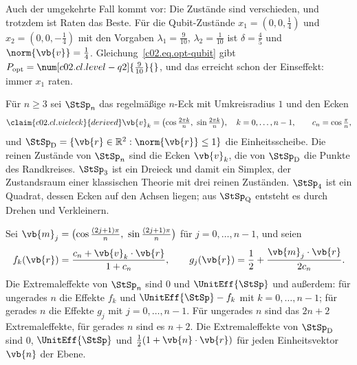 Auch der umgekehrte Fall kommt vor: Die Zustände sind verschieden, und trotzdem ist Raten
das Beste. Für die Qubit-Zustände $x_1 = (0, 0, \tfrac14)$ und $x_2 = (0, 0, -\tfrac14)$
mit den Vorgaben $\lambda_1 = \tfrac{9}{10}$, $\lambda_2 = \tfrac{1}{10}$ ist
$\delta = \tfrac45$ und $\norm{\vb{v}} = \tfrac14$. Gleichung~\eqref{c02.eq.opt-qubit} gibt
$P_{\mathrm{opt}} = \num[c02.cl.level-q2]{\tfrac{9}{10}}{}$, und das erreicht schon der
Einseffekt: immer $x_1$ raten.

\begin{vertiefung}[id=c02.v5,
    titel={Vielecke und die Scheibe},
    wozu={Zwischen Quadrat und Kugel liegt eine ganze Familie von Zustandsräumen in der
      Ebene. An ihr sieht man, wie die Unterscheidbarkeit reiner Zustände von der Form
      des Zustandsraums abhängt, und was sich über das Verhältnis der beiden Kegel sagen
      lässt.},
    voraussetzung={Kern bis Korollar~\ref{c02.cor.rein}; für den letzten Teil
      Vertiefung~\ref{c02.v2}. Der Kern braucht diesen Block nicht.},
    zurueck={Ob sich zwei reine Zustände sicher unterscheiden lassen, hängt von der Form
      des Zustandsraums ab und nicht nur von den beiden Punkten.}]
  Für $n \geq 3$ sei $\StSp_n$ das regelmäßige $n$-Eck mit Umkreisradius $1$ und den Ecken
  \begin{equation}\label{c02.eq.vieleck}\claim{c02.cl.vieleck}{derived}
    \vb{v}_k = \bigl(\cos\tfrac{2\pi k}{n},\ \sin\tfrac{2\pi k}{n}\bigr), \quad k = 0, \dots, n-1,
    \qquad c_n = \cos\tfrac{\pi}{n} ,
  \end{equation}
  und $\StSp_{\mathrm{D}} = \{ \vb{r} \in \mathbb{R}^2 : \norm{\vb{r}} \leq 1 \}$ die
  Einheitsscheibe. Die reinen Zustände von $\StSp_n$ sind die Ecken $\vb{v}_k$, die von
  $\StSp_{\mathrm{D}}$ die Punkte des Randkreises. $\StSp_3$ ist ein Dreieck und damit ein
  Simplex, der Zustandsraum einer klassischen Theorie mit drei reinen Zuständen. $\StSp_4$
  ist ein Quadrat, dessen Ecken auf den Achsen liegen; aus $\StSp_{\mathrm{Q}}$ entsteht es
  durch Drehen und Verkleinern.

  \begin{proposition}\label{c02.prop.vieleck}
    Sei $\vb{m}_j = \bigl(\cos\tfrac{(2j+1)\pi}{n},\ \sin\tfrac{(2j+1)\pi}{n}\bigr)$ für
    $j = 0, \dots, n-1$, und seien
    \begin{equation}\label{c02.eq.vieleck-effekte}
      f_k(\vb{r}) = \frac{c_n + \vb{v}_k\cdot\vb{r}}{1 + c_n},
      \qquad
      g_j(\vb{r}) = \frac12 + \frac{\vb{m}_j\cdot\vb{r}}{2 c_n} .
    \end{equation}
    Die Extremaleffekte von $\StSp_n$ sind $0$ und $\UnitEff{\StSp}$ und außerdem: für
    ungerades $n$ die Effekte $f_k$ und $\UnitEff{\StSp} - f_k$ mit $k = 0, \dots, n-1$;
    für gerades $n$ die Effekte $g_j$ mit $j = 0, \dots, n-1$.
    Für ungerades $n$ sind das $2n + 2$ Extremaleffekte, für gerades $n$ sind es $n + 2$.
    Die Extremaleffekte von $\StSp_{\mathrm{D}}$ sind $0$, $\UnitEff{\StSp}$ und
    $\tfrac12(1 + \vb{n}\cdot\vb{r})$ für jeden Einheitsvektor $\vb{n}$ der Ebene.
  \end{proposition}


\end{vertiefung}

